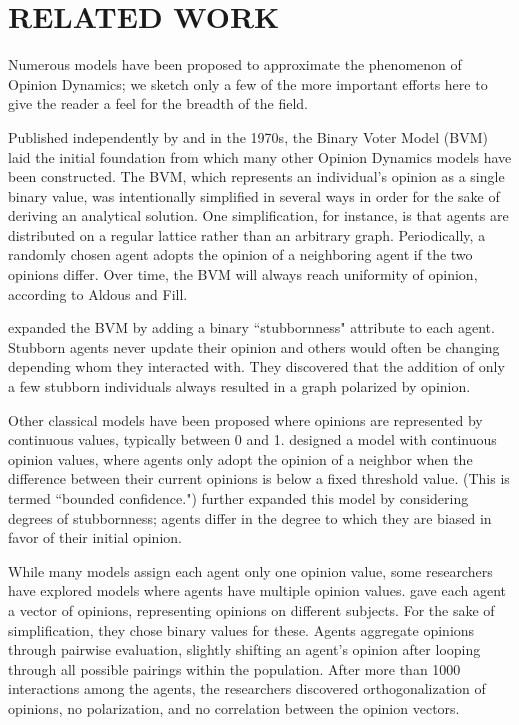 
\section{RELATED WORK}

Numerous models have been proposed to approximate the phenomenon of Opinion
Dynamics; we sketch only a few of the more important efforts here to give the
reader a feel for the breadth of the field.

Published independently by \cite{clifford_model_1973} and
\cite{holley_ergodic_1975} in the 1970s, the Binary Voter
Model (BVM) laid the initial foundation from which many other Opinion Dynamics
models have been constructed. The BVM, which represents an individual's
opinion as a single binary value, was intentionally simplified in several ways
in order for the sake of deriving an analytical solution. One simplification,
for instance, is that agents are distributed on a regular lattice rather than
an arbitrary graph. Periodically, a randomly chosen agent adopts the opinion
of a neighboring agent if the two opinions differ. Over time, the BVM will
always reach uniformity of opinion, according to Aldous and Fill.

\cite{yildiz_discrete_2011} expanded the BVM by adding a binary
``stubbornness" attribute to each agent. Stubborn agents never update their
opinion and 
others would often be changing depending whom they interacted with. They
discovered that the addition of only a few stubborn individuals always
resulted in a graph polarized by opinion.

Other classical models have been proposed where opinions are represented by
continuous values, typically between 0 and 1. \cite{weisbuch_interacting_2001}
designed a model with continuous opinion values, where agents only adopt the
opinion of a neighbor when the difference between their current opinions is
below a fixed threshold value. (This is termed ``bounded confidence.")
\cite{ghaderi_opinion_2012} further expanded this model by considering degrees
of stubbornness; agents differ in the degree to which they are biased in favor
of their initial opinion.

While many models assign each agent only one opinion value, some researchers
have explored models where agents have multiple opinion values.
\cite{deffuant_mixing_2000} gave each agent a vector of opinions, representing
opinions on different subjects. For the sake of simplification, they chose
binary values for these. Agents aggregate opinions through pairwise
evaluation, 
slightly shifting an agent's opinion after looping through all possible
pairings within the population. After more than 1000 interactions among the
agents, the researchers discovered orthogonalization of opinions, no
polarization, and no correlation between the opinion vectors.


